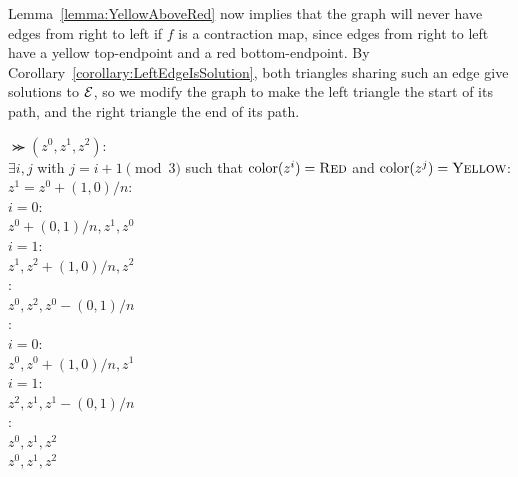   Lemma~\ref{lemma:YellowAboveRed} now implies that the \EOPL graph will never have edges from right to left if $f$ is a contraction map, since edges from right to left have a yellow top-endpoint and a red bottom-endpoint. By Corollary~\ref{corollary:LeftEdgeIsSolution}, both triangles sharing such an edge give solutions to $\mbox{${\mathcal E}$}$, so we modify the graph to make the left triangle the start of its path, and the right triangle the end of its path.

  \begin{algo}
    $\Succ(z^0,z^1,z^2)$:\+
    \\ \IfB $\exists i,j$ with $j = i + 1 \pmod{3}$ such that $\operatorname{color}(z^i) = \textsc{Red}$ and $\operatorname{color}(z^j) = \textsc{Yellow}$:\+
    \\   \IfB $z^1 = z^0 + (1,0)/n$:\quad{}  
    \\     \IfB $i = 0$:\+
    \\       \ReturnB $z^0+(0,1)/n,z^1,z^0$\quad{}\-
    \\     \ElseIfB $i = 1$:\+
    \\       \ReturnB $z^1,z^2 + (1,0)/n,z^2$\quad{}\-
    \\     \ElseB:\quad{}\+
    \\       \ReturnB $z^0,z^2,z^0 - (0,1)/n$\-\-
    \\   \ElseB:\quad{}\+
    \\     \IfB $i = 0$:\quad{}\+
    \\       \ReturnB $z^0,z^0+(1,0)/n,z^1$\-
    \\     \ElseIfB $i = 1$:\quad{}\+
    \\       \ReturnB $z^2,z^1,z^1-(0,1)/n$\-
    \\     \ElseB: \quad{}\+
    \\       \ReturnB $z^0,z^1,z^2$\quad{}\-\-\-
    \\ \ReturnB $z^0,z^1,z^2$\quad{}
  \end{algo}
    
